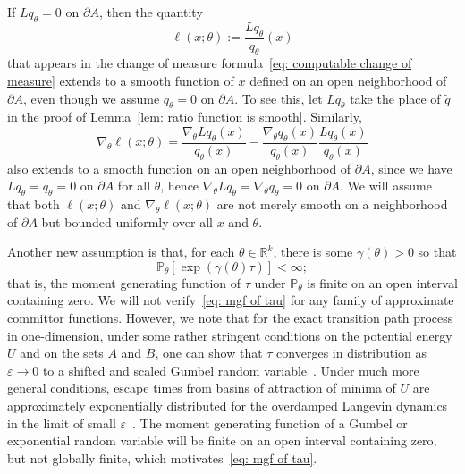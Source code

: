 \documentclass[reqno]{amsart}
\newcommand{\Real}{\mathbb{R}}
\newcommand{\eps}{\varepsilon}
\newcommand{\1}{\mathds{1}}
\newcommand{\grad}{\nabla}
\renewcommand{\P}{\mathds{P}}
\theoremstyle{definition}
\theoremstyle{remark}
\begin{document}
If $Lq_\theta=0$ on $\partial A$, then the quantity
\begin{equation*}
  \ell(x;\theta) := \frac{L q_\theta}{q_\theta}(x)
\end{equation*}
that appears in the change of measure formula~\eqref{eq: computable change of measure} extends to a smooth function of $x$ defined on an open neighborhood of $\partial A$, even though we assume $q_\theta =0$ on $\partial A$. To see this, let $Lq_\theta$ take the place of $\tilde q$ in the proof of Lemma~\ref{lem: ratio function is smooth}. Similarly, 
\begin{equation*}
  \grad_\theta \ell(x;\theta) = \frac{\grad_\theta L q_\theta (x)}{q_\theta (x)} - \frac{\grad_\theta q_\theta(x)}{q_\theta(x)} \frac{Lq_\theta(x)}{q_\theta(x)}
\end{equation*}
also extends to a smooth function on an open neighborhood of $\partial A$, since we have  $Lq_\theta= q_\theta =0$ on $\partial A$ for all $\theta$, hence $\grad_\theta Lq_\theta = \grad_\theta q_\theta =0$ on $\partial A$. We will assume that both $\ell(x;\theta)$ and $\grad_\theta \ell(x;\theta)$ are not merely smooth on a neighborhood of $\partial A$ but bounded uniformly over all $x$ and $\theta$.



Another new assumption is that, for each $\theta \in \Real^k$, there is some $\gamma(\theta) >0$ so that
\begin{equation}\label{eq: mgf of tau}
  \P_\theta[ \exp(\gamma(\theta) \tau)] < \infty;
\end{equation}
that is, the moment generating function of $\tau$ under $\P_\theta$ is finite on an open interval containing zero. We will not verify~\eqref{eq: mgf of tau} for any family of approximate committor functions. However, we note that for the exact transition path process in one-dimension, under some rather stringent conditions on the potential energy $U$ and on the sets $A$ and $B$,  one can show that $\tau$ converges in distribution as $\eps \rightarrow 0$ to a shifted and scaled Gumbel random variable~\cite{cerou_length_nodate}. Under much more general conditions, escape times from basins of attraction of minima of $U$ are approximately exponentially distributed for the overdamped Langevin dynamics in the limit of small $\eps$~\cite{gayrard_metastability_2004}. The moment generating function of a Gumbel or exponential random variable will be finite on an open interval containing zero, but not globally finite, which motivates~\eqref{eq: mgf of tau}. 
\end{document}
